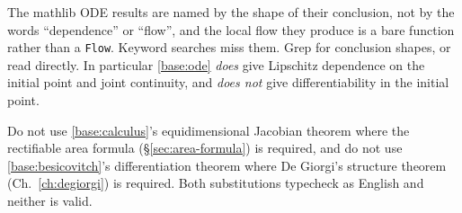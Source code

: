 \begin{fnote}\label{fnote:ode-trap}
The mathlib ODE results are named by the shape of their conclusion, not by
the words ``dependence'' or ``flow'', and the local flow they produce is a
bare function rather than a \texttt{Flow}.  Keyword searches miss them.
Grep for conclusion shapes, or read
 directly.  In particular
\ref{base:ode} \emph{does} give Lipschitz dependence on the initial point and
joint continuity, and \emph{does not} give differentiability in the initial
point.
\end{fnote}

\begin{fnote}\label{fnote:false-friends}
Do not use \ref{base:calculus}'s equidimensional Jacobian theorem where the
rectifiable area formula (\S\ref{sec:area-formula}) is required, and do not
use \ref{base:besicovitch}'s differentiation theorem where De Giorgi's
structure theorem (Ch.~\ref{ch:degiorgi}) is required.  Both substitutions
typecheck as English and neither is valid.
\end{fnote}

